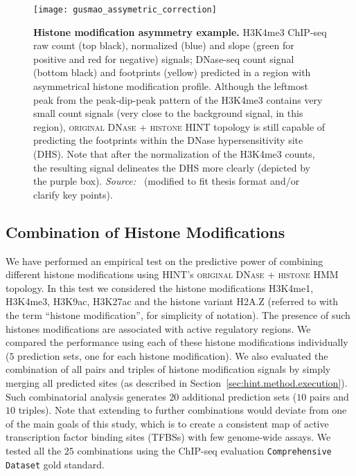 \begin{figure}[b!]
\centering
\texttt{[image: gusmao\_assymetric\_correction]}
\caption[Histone modification asymmetry example]{\textbf{Histone modification asymmetry example.} H3K4me3 ChIP-seq raw count (top black), normalized (blue) and slope (green for positive and red for negative) signals; DNase-seq count signal (bottom black) and footprints (yellow) predicted in a region with asymmetrical histone modification profile. Although the leftmost peak from the peak-dip-peak pattern of the H3K4me3 contains very small count signals (very close to the background signal, in this region), \textsc{original DNase + histone} HINT topology is still capable of predicting the footprints within the DNase hypersensitivity site (DHS). Note that after the normalization of the H3K4me3 counts, the resulting signal delineates the DHS more clearly (depicted by the purple box). \emph{Source:~\cite{gusmao2014}} (modified to fit thesis format and/or clarify key points).}
\label{fig:gusmao_assymetric_correction}
\end{figure}

\subsection{Combination of Histone Modifications}
\label{sec:ps.combination.histone.modifications}

We have performed an empirical test on the predictive power of combining different histone modifications using HINT's \textsc{original DNase + histone} HMM topology. In this test we considered the histone modifications H3K4me1, H3K4me3, H3K9ac, H3K27ac and the histone variant H2A.Z (referred to with the term ``histone modification'', for simplicity of notation). The presence of such histones modifications are associated with active regulatory regions. We compared the performance using each of these histone modifications individually ($5$ prediction sets, one for each histone modification). We also evaluated the combination of all pairs and triples of histone modification signals by simply merging all predicted sites (as described in Section~\ref{sec:hint.method.execution}). Such combinatorial analysis generates $20$ additional prediction sets ($10$ pairs and $10$ triples). Note that extending to further combinations would deviate from one of the main goals of this study, which is to create a consistent map of active transcription factor binding sites (TFBSs) with few genome-wide assays. We tested all the $25$ combinations using the ChIP-seq evaluation {\tt Comprehensive Dataset} gold standard.

